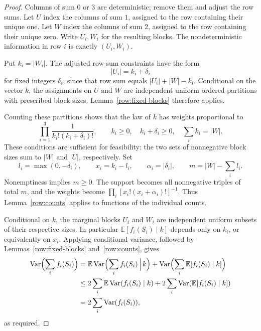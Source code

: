\begin{proof}
Columns of sum $0$ or $3$ are deterministic; remove them and adjust
the row sums.  Let $U$ index the columns of sum $1$, assigned to the
row containing their unique one.  Let $W$ index the columns of sum $2$,
assigned to the row containing their unique zero.  Write $U_i,W_i$
for the resulting blocks.  The nondeterministic information in row
$i$ is exactly $(U_i,W_i)$.

Put $k_i=|W_i|$.  The adjusted row-sum constraints have the form
\[
 |U_i|=k_i+\delta_i
\]
for fixed integers $\delta_i$, since that row sum equals
$|U_i|+|W|-k_i$.  Conditional on the vector $k$, the assignments on $U$
and $W$ are independent uniform ordered partitions with prescribed
block sizes.  Lemma~\ref{row:fixed-blocks} therefore applies.

Counting these partitions shows that the law of $k$ has weights
proportional to
\[
 \prod_{i=1}^3\frac1{k_i!(k_i+\delta_i)!},
 \qquad k_i\ge0,\quad k_i+\delta_i\ge0,\quad \sum_i k_i=|W|.
\]
These conditions are sufficient for feasibility: the two sets of
nonnegative block sizes sum to $|W|$ and $|U|$, respectively.  Set
\[
 l_i=\max(0,-\delta_i),\qquad
 x_i=k_i-l_i,\qquad \alpha_i=|\delta_i|,\qquad
 m=|W|-\sum_i l_i.
\]
Nonemptiness implies $m\ge0$.  The support becomes all nonnegative
triples of total $m$, and the weights become
$\prod_i[x_i!(x_i+\alpha_i)!]^{-1}$.
Thus Lemma~\ref{row:counts} applies to functions of the individual
counts.

Conditional on $k$, the marginal blocks $U_i$ and $W_i$ are independent
uniform subsets of their respective sizes.  In particular
$\mathbb E[f_i(S_i)\mid k]$ depends only on $k_i$, or equivalently on
$x_i$.  Applying conditional variance, followed by
Lemmas~\ref{row:fixed-blocks} and~\ref{row:counts}, gives
\begin{align*}
 \operatorname{Var}\Bigl(\sum_i f_i(S_i)\Bigr)
 &=\mathbb E\operatorname{Var}\Bigl(\sum_i f_i(S_i)\,\Big|\,k\Bigr)
   +\operatorname{Var}\Bigl(\sum_i\mathbb E[f_i(S_i)\mid k]\Bigr)\\
 &\le 2\sum_i\mathbb E\operatorname{Var}(f_i(S_i)\mid k)
     +2\sum_i\operatorname{Var}(\mathbb E[f_i(S_i)\mid k])\\
 &=2\sum_i\operatorname{Var}(f_i(S_i)),
\end{align*}
as required.
\end{proof}
